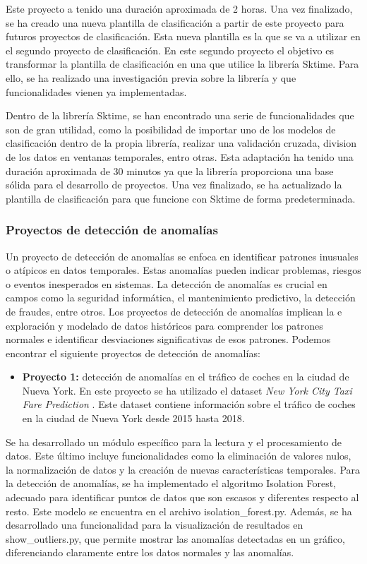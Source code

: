 Este proyecto a tenido una duración aproximada de 2 horas. Una vez finalizado, se ha creado una nueva
plantilla de clasificación a partir de este proyecto para futuros proyectos de clasificación. Esta nueva
plantilla es la que se va a utilizar en el segundo proyecto de clasificación. En este segundo proyecto
el objetivo es transformar la plantilla de clasificación en una que utilice la librería Sktime. Para ello,
se ha realizado una investigación previa sobre la librería y que funcionalidades vienen ya implementadas.\medskip

Dentro de la librería Sktime, se han encontrado una serie de funcionalidades que son de gran utilidad,
como la posibilidad de importar uno de los modelos de clasificación dentro de la propia librería, realizar
una validación cruzada, division de los datos en ventanas temporales, entro otras. Esta adaptación ha
tenido una duración aproximada de 30 minutos ya que la librería proporciona una base sólida para el desarrollo
de proyectos. Una vez finalizado, se ha actualizado la plantilla de clasificación para que funcione con 
Sktime de forma predeterminada.

\subsubsection{Proyectos de detección de anomalías}
Un proyecto de detección de anomalías se enfoca en identificar patrones inusuales o 
atípicos en datos temporales. Estas anomalías pueden indicar problemas, riesgos o 
eventos inesperados en sistemas. La detección de anomalías 
es crucial en campos como la seguridad informática, el mantenimiento predictivo, la 
detección de fraudes, entre otros. Los proyectos de detección de anomalías implican la e
exploración y modelado de datos históricos para comprender los patrones normales e identificar 
desviaciones significativas de esos patrones. Podemos encontrar el siguiente proyectos de detección de anomalías:

\begin{itemize}
    \item \textbf{Proyecto 1:} detección de anomalías en el tráfico de coches en la ciudad de Nueva York.
    En este proyecto se ha utilizado el dataset \textit{New York City Taxi Fare Prediction} \cite{Traffic_NY}.
    Este dataset contiene información sobre el tráfico de coches en la ciudad de Nueva York desde 2015
    hasta 2018.
\end{itemize}

Se ha desarrollado un módulo específico para la lectura y el procesamiento de datos. 
Este último incluye funcionalidades como la eliminación de valores nulos, la normalización de datos 
y la creación de nuevas características temporales. Para la detección de anomalías, 
se ha implementado el algoritmo Isolation Forest, adecuado para identificar puntos 
de datos que son escasos y diferentes respecto al resto. Este modelo se encuentra 
en el archivo isolation\_forest.py. Además, se ha desarrollado una funcionalidad 
para la visualización de resultados en show\_outliers.py, que permite mostrar las 
anomalías detectadas en un gráfico, diferenciando claramente entre los datos 
normales y las anomalías.

